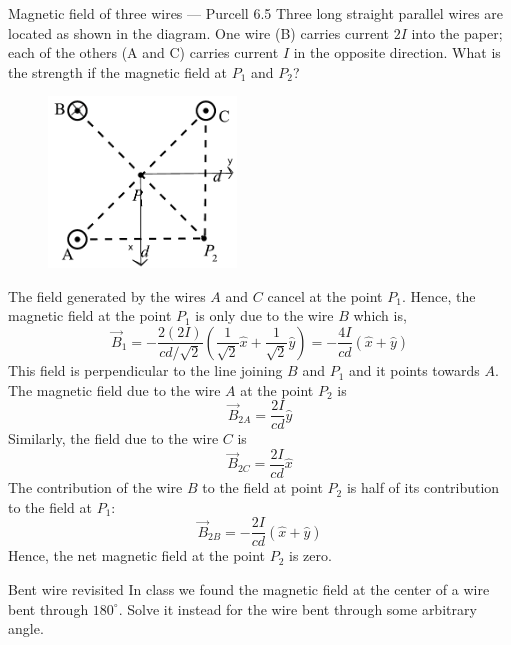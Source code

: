 \documentclass[makesolutionspdf]{esg8022pset}
\begin{document}
\begin{problem}{Magnetic field of three wires --- Purcell 6.5}
  Three long straight parallel wires are located as shown in the diagram. One
  wire (B) carries current $2 I$ into the paper; each of the others (A and C)
  carries current $I$ in the opposite direction. What is the strength if the
  magnetic field at $P_1$ and $P_{2}$?
  \begin{figure}[H]
    \centering
    \includegraphics[width = 5cm]{Threewires}
  \end{figure}
\end{problem}

\begin{solution}
  The field generated by the wires $A$ and $C$ cancel at the point $P_{1}$.
  Hence, the magnetic field at the point $P_{1}$ is only due
  to the wire $B$ which is,
  $$\vec{B}_{1} = -\frac{2 (2I)}{ c d/\sqrt{2}} \left( \frac{1}{\sqrt{2} } \hat{x}+\frac{1}{\sqrt{2} } \hat{y} \right) = -\frac{4I}{cd} ( \hat{x} +  \hat{y})$$
  This field is perpendicular to the line joining $B$ and $P_{1}$ and it points
  towards $A$.\\
  \noindent  The magnetic field due to the wire $A$ at  the point $P_{2}$ is
  $$\vec{B}_{2A} =\frac {2 I}{cd}  \hat{y}$$
  Similarly, the field due to the wire $C$ is
  $$\vec{B}_{2C} = \frac{2 I}{cd}  \hat{x}$$
  The contribution of the wire $B$ to the field at point $P_{2}$ is half of its contribution to the field at $P_{1}$: 
  $$\vec{B}_{2B} =  -\frac{2I}{cd} ( \hat{x} +  \hat{y})$$
  Hence, the net magnetic field at the point $P_{2}$ is zero.
\end{solution}





\begin{problem}{Bent wire revisited}
  In class we found the magnetic field at the center of a wire bent through
  $180^\circ$.  Solve it instead for the wire bent through some arbitrary
  angle.
\end{problem}
\end{document}

